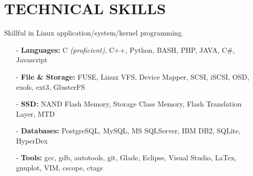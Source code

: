 \section{TECHNICAL SKILLS}
\vspace{0.03in}
Skillful in Linux application/system/kernel programming.
\begin{itemize}[leftmargin=*]
\setlength\itemsep{-0.02in}
\item[-] {\bf Languages:} C {\footnotesize \it (proficient)}, C++,
	Python, BASH, PHP, JAVA, C\#, Javascript
\item[-] {\bf File \& Storage:} FUSE, Linux VFS, Device Mapper, SCSI, iSCSI, OSD,
exofs, ext3, GlusterFS
\item[-] {\bf SSD:} NAND Flash Memory, Storage Class Memory,
	Flash Translation Layer, MTD %
\item[-] {\bf Databases:} PostgreSQL, MySQL, MS SQLServer, IBM DB2, SQLite, HyperDex
\item[-] {\bf Tools:} gcc, gdb, autotools, git, Glade, Eclipse, Visual Studio, LaTex, gnuplot,
                      VIM, cscope, ctags
\end{itemize}

